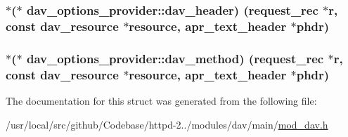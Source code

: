 \subsubsection[{\texorpdfstring{dav\+\_\+header}{dav_header}}]{$\ast$($\ast$ dav\+\_\+options\+\_\+provider\+::dav\+\_\+header) ({\bf request\+\_\+rec} $\ast${\bf r}, const {\bf dav\+\_\+resource} $\ast${\bf resource}, {\bf apr\+\_\+text\+\_\+header} $\ast${\bf phdr})}\hypertarget{structdav__options__provider_a3da58aa5f6bc72ca913ff4bd7458c9f2}{}\label{structdav__options__provider_a3da58aa5f6bc72ca913ff4bd7458c9f2}
\subsubsection[{\texorpdfstring{dav\+\_\+method}{dav_method}}]{$\ast$($\ast$ dav\+\_\+options\+\_\+provider\+::dav\+\_\+method) ({\bf request\+\_\+rec} $\ast${\bf r}, const {\bf dav\+\_\+resource} $\ast${\bf resource}, {\bf apr\+\_\+text\+\_\+header} $\ast${\bf phdr})}\hypertarget{structdav__options__provider_ac1ff422a3f04c5d02ae61b90a8478856}{}\label{structdav__options__provider_ac1ff422a3f04c5d02ae61b90a8478856}


The documentation for this struct was generated from the following file\+:\begin{DoxyCompactItemize}
\item 
/usr/local/src/github/\+Codebase/httpd-\/2../modules/dav/main/\hyperlink{mod__dav_8h}{mod\+\_\+dav.\+h}\end{DoxyCompactItemize}
